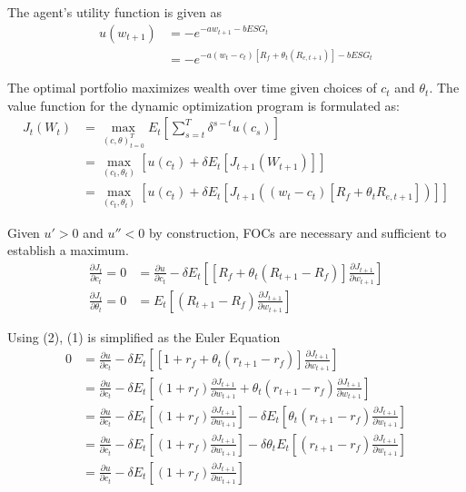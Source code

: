 \documentclass[]{article}
\begin{document}
The agent's utility function is given as 
\begin{align*}
	u(w_{t+1}) &= -e^{-aw_{t+1}-bESG_t}\\
	&= -e^{-a (w_t - c_t)[R_f + \theta_t (R_{e, t+1})] -bESG_t}
\end{align*}

\newpage
The optimal portfolio maximizes wealth over time given choices of $c_t$ and $\theta_t$. The value function for the dynamic optimization program is formulated as:
\begin{align*}
	J_t(W_t) &= \max_{(c, \theta)_{t=0}^T} E_t \left[\sum_{s=t}^{T} \delta^{s-t}u(c_s)\right]\\
	&= \max_{(c_t, \theta_t)} \left[u(c_t) + \delta E_t\left[J_{t+1}(W_{t+1})\right]\right]\\
	&= \max_{(c_t, \theta_t)} \left[u(c_t) + \delta E_t\left[J_{t+1}((w_t - c_t)[R_f + \theta_t R_{e, t+1} ])\right]\right]
\end{align*}

Given $u'>0$ and $u''<0$ by construction, FOCs are necessary and sufficient to establish a maximum.
\begin{align}
	\frac{\partial J_t}{\partial c_t} = 0 &= \frac{\partial u}{\partial c_t} - \delta E_t \left[[R_f + \theta_t (R_{t+1} - R_f) ]\frac{\partial J_{t+1}}{\partial w_{t+1}}\right]\\
	\frac{\partial J_t}{\partial \theta_t} = 0 &= E_t \left[(R_{t+1}-R_f) \frac{\partial J_{t+1}}{\partial w_{t+1}} \right]
\end{align}

Using (2), (1) is simplified as the Euler Equation
\begin{align*}
	0 &= \frac{\partial u}{\partial c_t} - \delta E_t \left[\left[1 + r_f + \theta_t(r_{t+1}-r_f) \right]\frac{\partial J_{t+1}}{\partial w_{t+1}}\right]\\
	&= \frac{\partial u}{\partial c_t} - \delta E_t \left[(1 + r_f) \frac{\partial J_{t+1}}{\partial w_{t+1}} + \theta_t(r_{t+1}-r_f) \frac{\partial J_{t+1}}{\partial w_{t+1}}\right] \\
	&= \frac{\partial u}{\partial c_t} - \delta E_t \left[(1 + r_f)\frac{\partial J_{t+1}}{\partial w_{t+1}} \right] - \delta E_t \left[ \theta_t(r_{t+1}-r_f) \frac{\partial J_{t+1}}{\partial w_{t+1}}\right] \\
	&= \frac{\partial u}{\partial c_t} - \delta E_t \left[(1 + r_f)\frac{\partial J_{t+1}}{\partial w_{t+1}} \right] - \delta \theta_t E_t \left[(r_{t+1}-r_f) \frac{\partial J_{t+1}}{\partial w_{t+1}}\right] \\
	&= \frac{\partial u}{\partial c_t} - \delta E_t \left[(1 + r_f)\frac{\partial J_{t+1}}{\partial w_{t+1}} \right]
\end{align*}
\end{document}
